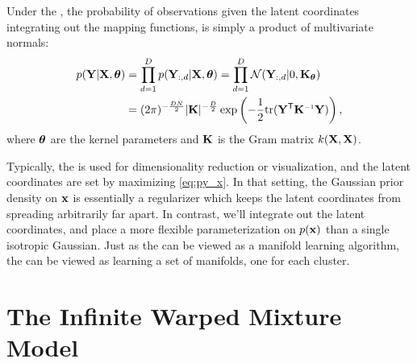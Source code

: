 Under the \gplvm{}, the probability of observations given the latent coordinates integrating out the mapping functions, is simply a product of multivariate normals:
\begin{align}
p(\vY | \vX, \vtheta) 
& = \prod_{d=1}^D p(\vY_{:,d} | \vX, \vtheta) = \prod_{d=1}^D \N{\vY_{:,d}}{0}{\vK_\vtheta} \\ 
& = (2 \pi)^{-\frac{DN}{2}}  |\vK|^{-\frac{D}{2}} \exp \left( -\frac{1}{2} {\rm tr}( \vY\tra \vK\inv \vY) \right),
\label{eq:py_x}
\end{align}
where ${\boldsymbol{\theta}}$ are the kernel parameters and $\mathbf{K}$ is the Gram matrix $k(\mathbf{X}, \mathbf{X})$.

Typically, the \gplvm{} is used for dimensionality reduction or visualization, and the latent coordinates are set by maximizing \eqref{eq:py_x}.
In that setting, the Gaussian prior density on ${\bf{x}}$ is essentially a regularizer which keeps the latent coordinates from spreading arbitrarily far apart.  
In contrast, we'll integrate out the latent coordinates, and place a more flexible parameterization on $p({\bf{x}})$ than a single isotropic Gaussian.
Just as the \gplvm{} can be viewed as a manifold learning algorithm, the \iwmm{} can be viewed as learning a set of manifolds, one for each cluster.





\section{The Infinite Warped Mixture Model}
\label{sec:iwmm-definition}

